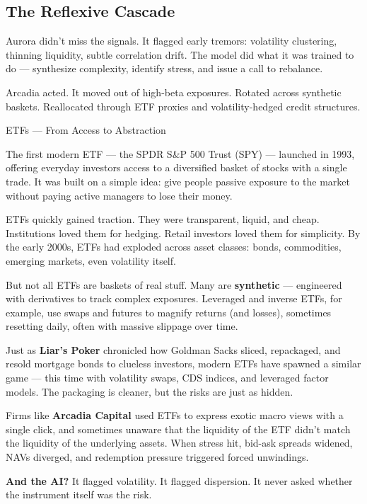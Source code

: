\subsection{The Reflexive Cascade}

Aurora didn’t miss the signals.  
It flagged early tremors: volatility clustering, thinning liquidity, subtle correlation drift.  
The model did what it was trained to do — synthesize complexity, identify stress, and issue a call to rebalance.

Arcadia acted.  
It moved out of high-beta exposures.  
Rotated across synthetic baskets.  
Reallocated through ETF proxies and volatility-hedged credit structures.

\medskip

\begin{TechnicalSidebar}{ETFs --- From Access to Abstraction}

  The first modern ETF — the SPDR S\&P 500 Trust (SPY) — launched in 1993, offering everyday investors access to a 
  diversified basket of stocks with a single trade. It was built on a simple idea: give people passive exposure to the 
  market without paying active managers to lose their money.

  \medskip
  
  ETFs quickly gained traction. They were transparent, liquid, and cheap. Institutions loved them for hedging. Retail 
  investors loved them for simplicity. By the early 2000s, ETFs had exploded across asset classes: bonds, commodities, 
  emerging markets, even volatility itself.

  \medskip
  
  But not all ETFs are baskets of real stuff. Many are \textbf{synthetic} — engineered with derivatives to track complex 
  exposures. Leveraged and inverse ETFs, for example, use swaps and futures to magnify returns (and losses), sometimes 
  resetting daily, often with massive slippage over time.

  \medskip
  
  Just as \textbf{Liar’s Poker} chronicled how Goldman Sacks sliced, repackaged, and resold mortgage bonds to clueless investors, 
  modern ETFs have spawned a similar game — this time with volatility swaps, CDS indices, and leveraged factor models. 
  The packaging is cleaner, but the risks are just as hidden.

  \medskip
  
  Firms like \textbf{Arcadia Capital} used ETFs to express exotic macro views with a single click, and sometimes unaware that 
  the liquidity of the ETF didn’t match the liquidity of the underlying assets. When stress hit, bid-ask spreads widened, 
  NAVs diverged, and redemption pressure triggered forced unwindings.

  \medskip
  
  \textbf{And the AI?}  
  It flagged volatility.  
  It flagged dispersion.  
  It never asked whether the instrument itself was the risk.
  
\end{TechnicalSidebar}

